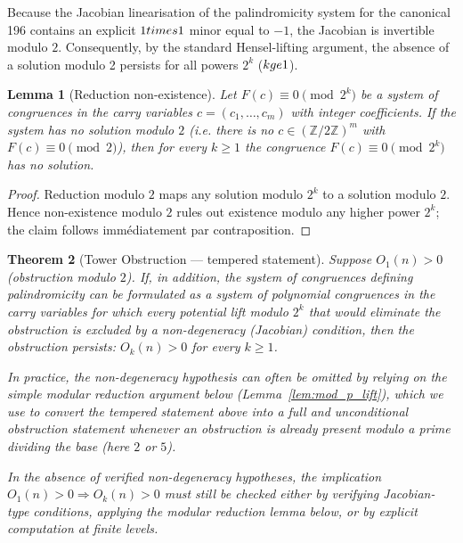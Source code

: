 \documentclass[12pt,a4paper]{article}
\newtheorem{theorem}{Theorem}[section]
\newtheorem{lemma}[theorem]{Lemma}
\begin{document}
Because the Jacobian linearisation of the palindromicity system for the canonical 196 contains an explicit $1\\times1$ minor equal to $-1$, the Jacobian is invertible modulo $2$. Consequently, by the standard Hensel-lifting argument, the absence of a solution modulo 2 persists for all powers $2^{k}$ ($k\\ge 1$).
\begin{lemma}[Reduction non-existence]
\label{lem:reduction_nonexist-8}
Let $F(c)\equiv 0\pmod{2^k}$ be a system of congruences in the carry variables $c=(c_1,\dots,c_m)$ with integer coefficients. If the system has no solution modulo $2$ (i.e. there is no $c\in(\mathbb Z/2\mathbb Z)^m$ with $F(c)\equiv0\pmod 2$), then for every $k\ge1$ the congruence $F(c)\equiv0\pmod{2^k}$ has no solution.
\end{lemma}

\begin{proof}
Reduction modulo $2$ maps any solution modulo $2^k$ to a solution modulo $2$. Hence non-existence modulo $2$ rules out existence modulo any higher power $2^k$; the claim follows immédiatement par contraposition.
\end{proof}

\begin{theorem}[Tower Obstruction --- tempered statement]\label{thm:tower-8}
Suppose $O_1(n) > 0$ (obstruction modulo $2$). If, in addition, the system of congruences defining palindromicity can be formulated as a system of polynomial congruences in the carry variables for which every potential lift modulo $2^k$ that would eliminate the obstruction is excluded by a non-degeneracy (Jacobian) condition, then the obstruction persists: $O_k(n) > 0$ for every $k \ge 1$.

In practice, the non-degeneracy hypothesis can often be omitted by relying on the simple modular reduction argument below (Lemma~\ref{lem:mod_p_lift}), which we use to convert the tempered statement above into a full and unconditional obstruction statement whenever an obstruction is already present modulo a prime dividing the base (here $2$ or $5$).

In the absence of verified non-degeneracy hypotheses, the implication $O_1(n)>0 \Rightarrow O_k(n)>0$ must still be checked either by verifying Jacobian-type conditions, applying the modular reduction lemma below, or by explicit computation at finite levels.
\end{theorem}
\end{document}
